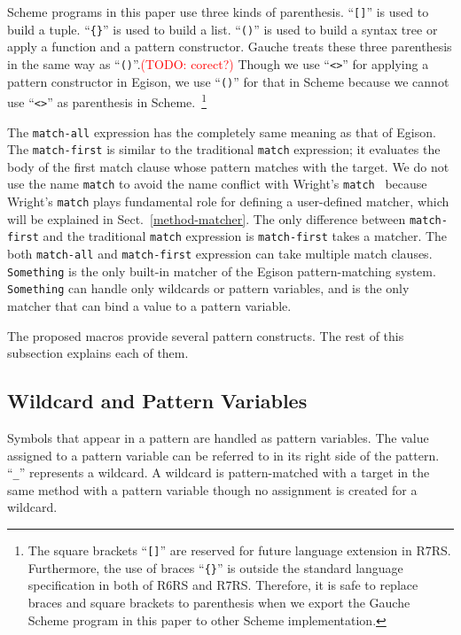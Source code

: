 \documentclass[acmlarge]{acmart}
\newcommand{\todo}[1]{\textcolor{red}{(TODO: #1)}}
\newcommand{\new}[1]{\textcolor{blue}{#1}}
\begin{document}
Scheme programs in this paper use three kinds of parenthesis.
``\lstinline{[]}'' is used to build a tuple.
``\texttt{\{\}}'' is used to build a list. %
``\lstinline{()}'' is used to build a syntax tree or apply a function and a pattern constructor.
Gauche treats these three parenthesis in the same way as ``\lstinline{()}''.\todo{corect?}
Though we use ``\lstinline{<>}'' for applying a pattern constructor in Egison, we use ``\lstinline{()}'' for that in Scheme because we cannot use ``\lstinline{<>}'' as parenthesis in Scheme.~\footnote{The square brackets ``\lstinline{[]}'' are reserved for future language extension in R7RS.
Furthermore, the use of braces ``\texttt{\{\}}'' is outside the standard language specification in both of R6RS and R7RS.
Therefore, it is safe to replace braces and square brackets to parenthesis when we export the Gauche Scheme program in this paper to other Scheme implementation.
}

The \texttt{match-all} expression has the completely same meaning as that of Egison.
The \texttt{match-first} is similar to the traditional \texttt{match} expression; it evaluates the body of the first match clause whose pattern matches with the target.
We do not use the name \texttt{match} to avoid the name conflict with Wright's \texttt{match}~\cite{wright1993pattern} because Wright's \texttt{match} plays fundamental role for defining a user-defined matcher, which will be explained in Sect.~\ref{method-matcher}.
The only difference between \texttt{match-first} and the traditional \texttt{match} expression is \texttt{match-first} takes a matcher.
The both \texttt{match-all} and \texttt{match-first} expression can take multiple match clauses.
\lstinline{Something} is the only built-in matcher of the Egison pattern-matching system.
\lstinline{Something} can handle only wildcards or pattern variables, and is the only matcher that can bind a value to a pattern variable.

The proposed macros provide several pattern constructs.
The rest of this subsection explains each of them.

\subsection{Wildcard and Pattern Variables}

Symbols that appear in a pattern are handled as pattern variables.
The value assigned to a pattern variable can be referred to in its right side of the pattern.
``\lstinline{_}'' represents a wildcard.
A wildcard is pattern-matched with a target in the same method with a pattern variable though no assignment is created for a wildcard.
\end{document}
